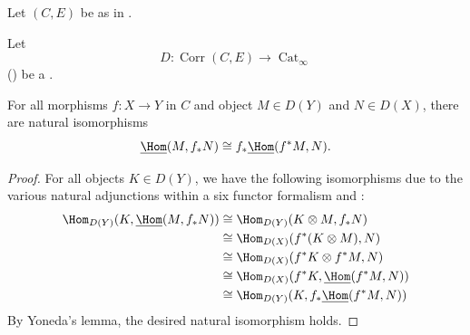 \begin{proposition}  \label{proposition:hom_to_pushforward_is_isom_to_pushforward_of_hom_from_pullback_for_a_six_functor_formalism_for_an_infty_category_with_finite_limits_and_a_class_of_morphisms_containing_isomorphisms_and_stable_under_pullback_and_composition}
    Let $(C,E)$ be as in . 


    Let 
    $$D \colon \operatorname{Corr}(C,E) \to \operatorname{Cat}_\infty$$
    ()
    be a .

    For all morphisms $f: X \to Y$ in $C$ and object $M \in D(Y)$ and $N \in D(X)$, there are natural isomorphisms
    $$\underline{\Hom}(M, f_* N) \cong f_* \underline{\Hom}(f^*M, N).$$
\end{proposition}
\begin{proof}
    For all objects $K \in D(Y)$, we have the following isomorphisms due to the various natural adjunctions within a six functor formalism and :
    \begin{align*}
        \Hom_{D(Y)}(K, \underline{\Hom}(M, f_* N)) &\cong \Hom_{D(Y)}(K \otimes M,  f_* N)  \\
        &\cong \Hom_{D(X)}(f^*(K \otimes M),  N)  \\
        &\cong \Hom_{D(X)}(f^* K \otimes f^* M,  N)  \\
        &\cong \Hom_{D(X)}(f^* K , \underline{\Hom}(f^* M, N))  \\
        &\cong \Hom_{D(Y)}(K , f_* \underline{\Hom}(f^* M, N))  \\
    \end{align*}
    By Yoneda's lemma, the desired natural isomorphism holds.
\end{proof}